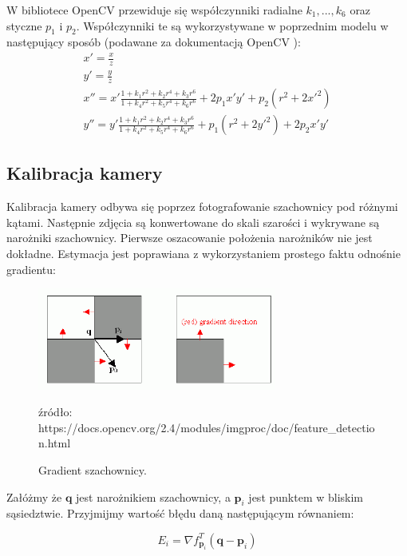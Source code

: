 \documentclass[oneside, eng]{mgr}
\newcommand{\bb}{\textbf}
\begin{document}
W bibliotece OpenCV przewiduje się współczynniki radialne $k_1, ..., k_6$ oraz styczne $p_1$ i $p_2$. Współczynniki te są wykorzystywane w poprzednim modelu w następujący sposób (podawane za dokumentacją OpenCV \cite{Dokumentacja OpenCV}):
\begin{gather*}
	x' = \frac{x}{z} \\
	y' = \frac{y}{z} \\
	x'' = x' \frac{1+k_1 r^2 + k_2 r^4 + k_3 r^6}{1+k_4 r^2+k_5 r^4+k_6 r^6} +
	2 p_1 x' y' + p_2(r^2 + 2 x'^2)	\\
	y'' = y' \frac{1+k_1 r^2 + k_2 r^4 + k_3 r^6}{1+k_4 r^2+k_5 r^4+k_6 r^6} +
	p_1(r^2 + 2 y'^2) + 2 p_2 x' y'
\end{gather*}


\subsection{Kalibracja kamery}

Kalibracja kamery odbywa się poprzez fotografowanie szachownicy pod różnymi kątami. Następnie zdjęcia są konwertowane do skali szarości i wykrywane są narożniki szachownicy. Pierwsze oszacowanie położenia narożników nie jest dokładne. Estymacja jest poprawiana z wykorzystaniem prostego faktu odnośnie gradientu:

\begin{figure}
\centering
	\includegraphics[width=0.70\textwidth]{cornersubpix.png}\par\vspace{1cm}
\caption{Gradient szachownicy.}
źródło: https://docs.opencv.org/2.4/modules/imgproc/doc/feature\_detection.html
	\label{fig:gradient}
\end{figure}

Załóżmy że $\bb{q}$ jest narożnikiem szachownicy, a $\bb{p}_i$ jest punktem w bliskim sąsiedztwie. Przyjmijmy wartość błędu daną następującym równaniem:

\begin{equation}
	E_i = \nabla f_{\bb{p}_i}^T (\bb{q} - \bb{p}_i)
\end{equation}
\end{document}

